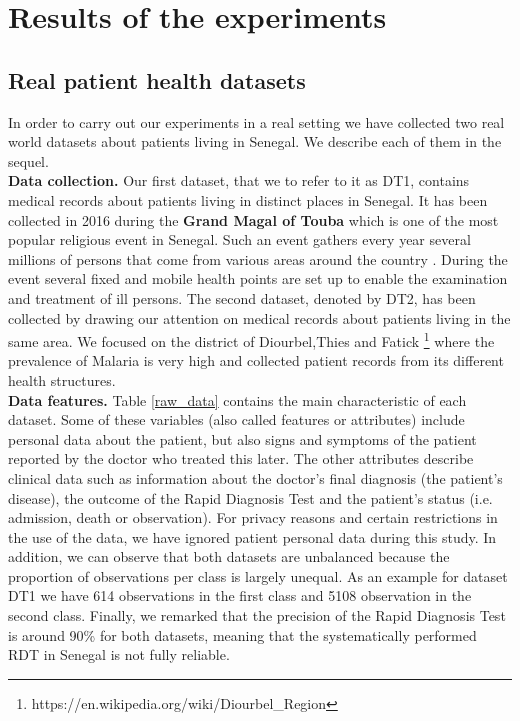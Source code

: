 \section{Results of the experiments}
\subsection{Real patient health datasets}\label{datasets}
In order to carry out  our experiments in a real setting we have collected two real world datasets about patients living in Senegal. We describe each of them in the sequel.\\
\textbf{Data collection.} Our first dataset, that we  to refer to it as DT1, contains medical records about patients living in distinct places in Senegal. It has been collected in 2016 during the \textbf{Grand Magal of Touba}  which is one of the most popular religious event in Senegal. Such an event gathers every year several millions of persons that come from various areas around the country \cite{Ch17}.  During the event several fixed and mobile health points are set up to enable the examination and treatment of ill persons. The second dataset, denoted by DT2, has been collected by drawing our attention on medical records about patients living in the same area. We focused on the district of Diourbel,Thies and Fatick \footnote{https://en.wikipedia.org/wiki/Diourbel\_Region} where the prevalence of Malaria is very high and collected patient records from its different health structures. \\
\textbf{Data features. } Table \ref{raw_data} contains the main characteristic of each dataset. Some of these variables (also called features or attributes) include personal data about the patient, but also signs and symptoms of the patient reported by the doctor who treated this later. The other attributes describe clinical data such as information about the doctor's final diagnosis (the patient's disease), the outcome of the Rapid Diagnosis Test and the patient's status (i.e. admission, death or observation). For privacy reasons and certain restrictions in the use of the data, we have ignored patient personal data  during this study.
In addition, we can observe that  both datasets are unbalanced because the proportion of observations per class is largely unequal. As an example for dataset DT1 we have 614 observations in the first class and 5108 observation in the second class. Finally, we remarked that the precision of the Rapid Diagnosis Test is around 90\% for both datasets, meaning that the systematically performed RDT in Senegal is not fully reliable.

